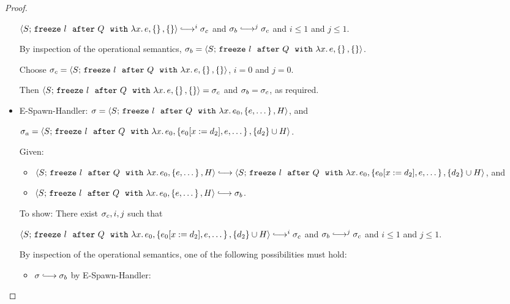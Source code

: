 \begin{proof}
\begin{itemize}
      $\config{S}{\freezeafterfull{l}{Q}{\lam{x}{e}}{\setof{}}{\setof{}}}
      \parstepsto^i \conf_c$ and $\conf_b \parstepsto^j \conf_c$ and
      $i \leq 1$ and $j \leq 1$.

      By inspection of the operational semantics, $\sigma_b =
      \langle S;\, \mbox{\texttt{freeze}}~l~~{\mbox{\texttt{after}}}~Q~~{\mbox{\texttt{with}}}~\lambda x.\,e, \left\{\right\}, \left\{\right\} \rangle$.

      Choose $\sigma_c =
      \langle S;\, \mbox{\texttt{freeze}}~l~~{\mbox{\texttt{after}}}~Q~~{\mbox{\texttt{with}}}~\lambda x.\,e, \left\{\right\}, \left\{\right\} \rangle$,
      $i = 0$ and $j = 0$.

      Then
      $\langle S;\, \mbox{\texttt{freeze}}~l~~{\mbox{\texttt{after}}}~Q~~{\mbox{\texttt{with}}}~\lambda x.\,e, \left\{\right\}, \left\{\right\} \rangle
      = \sigma_c$ and $\sigma_b = \sigma_c$, as required.

    \item {\sc E-Spawn-Handler}: $\sigma =
      \langle S;\, \mbox{\texttt{freeze}}~l~~{\mbox{\texttt{after}}}~Q~~{\mbox{\texttt{with}}}~\lambda x.\,e_0, \left\{e,
            \dots\right\}, H \rangle$, and

      $\sigma_a =
      \langle S;\, \mbox{\texttt{freeze}}~l~~{\mbox{\texttt{after}}}~Q~~{\mbox{\texttt{with}}}~\lambda x.\,e_0, \left\{e_0[x := d_2],
            e, \dots\right\}, \{d_2\}\cup H \rangle$.

      Given:
      \begin{itemize}
      \item $\config{S}{\freezeafterfull{l}{Q}{\lam{x}{e_0}}{\setof{e,
            \dots}}{H}} \parstepsto \\
        \config{S}{\freezeafterfull{l}{Q}{\lam{x}{e_0}}{\setof{\subst{e_0}{x}{d_2},
              e, \dots}} {\{d_2\}\cup H}}$, and
      \item $\config{S}{\freezeafterfull{l}{Q}{\lam{x}{e_0}}{\setof{e,
            \dots}}{H}} \parstepsto \conf_b$.
      \end{itemize}

      To show: There exist $\sigma_c, i, j$ such that

      $\config{S}{\freezeafterfull{l}{Q}{\lam{x}{e_0}}{\setof{\subst{e_0}{x}{d_2},
            e, \dots}} {\{d_2\}\cup H}} \parstepsto^i \conf_c$ and
      $\conf_b \parstepsto^j \conf_c$ and $i \leq 1$ and $j \leq 1$.


      By inspection of the operational semantics, one of the following
      possibilities must hold:
      \begin{itemize}
      \item $\conf \parstepsto \conf_b$ by {\sc E-Spawn-Handler}:


\end{itemize}
\end{itemize}
\end{proof}
